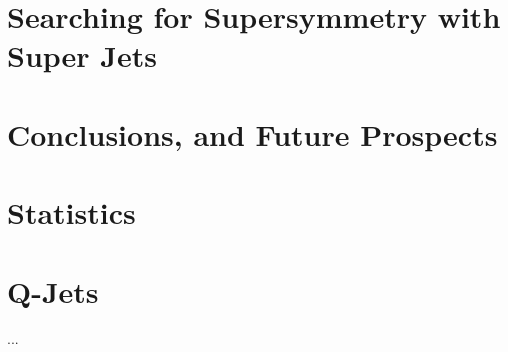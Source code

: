 \documentclass{report}
\begin{document}
\chapter{Searching for Supersymmetry with Super Jets}



\chapter{Conclusions, and Future Prospects}



\appendix
\chapter{Statistics}

\chapter{Q-Jets}
         ...


\end{document}
